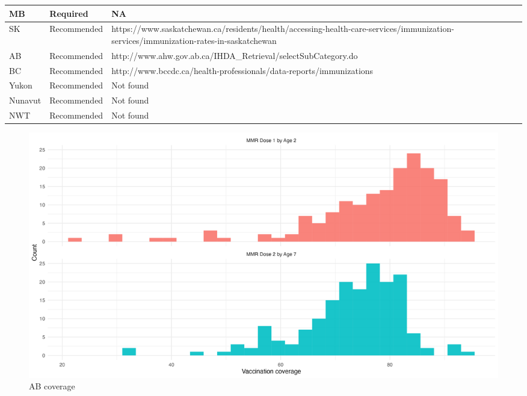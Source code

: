 \documentclass[12pt,a4paper]{article}
\begin{document}
\begin{table}[h!]
\begin{tabular}{lp{3cm}p{10cm}}
MB       & Required                  & NA                                                                                                                                                                                  \\ \hline
SK       & Recommended               & https://www.saskatchewan.ca/residents/health/accessing-health-care-services/immunization-services/immunization-rates-in-saskatchewan                                                \\ \hline
AB       & Recommended               & http://www.ahw.gov.ab.ca/IHDA\_Retrieval/selectSubCategory.do                                                                                                                       \\ \hline
BC       & Recommended               & http://www.bccdc.ca/health-professionals/data-reports/immunizations                                                                                                                 \\ \hline
Yukon    & Recommended               & Not found                                                                                                                                                                           \\ \hline
Nunavut  & Recommended               & Not found                                                                                                                                                                           \\ \hline
NWT      & Recommended               & Not found
\end{tabular}
\end{table}

\begin{figure}[h]
\includegraphics[width=0.8\linewidth]{report-figs/f1.png}
\caption{AB coverage}
\label{fig:abcov}
\end{figure}
\end{document}
